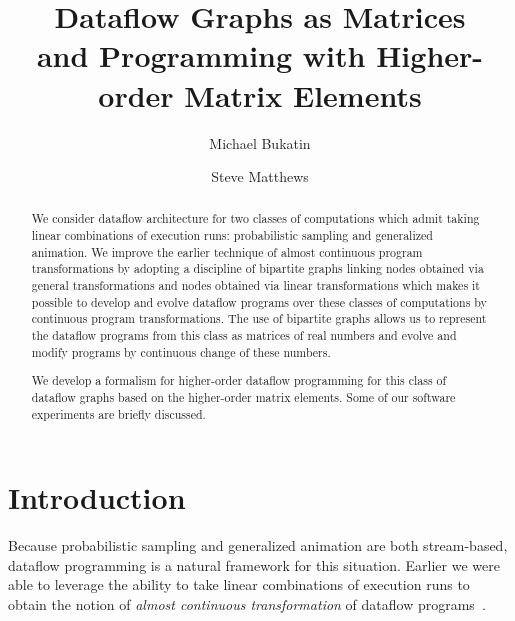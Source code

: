 \documentclass[withtimes]{easychair}
\begin{document}
\title{Dataflow Graphs as Matrices\\ and Programming with Higher-order Matrix Elements}
\author{Michael Bukatin\and Steve Matthews}


\maketitle

\begin{abstract}
We consider dataflow architecture for two classes of computations which admit taking linear combinations of execution runs:
probabilistic sampling and generalized animation. We improve the earlier technique of almost continuous program transformations
by adopting a discipline of bipartite graphs linking nodes obtained via general transformations and nodes obtained
via linear transformations which makes it possible to develop and evolve dataflow programs over these classes
of computations by continuous program transformations. The use of bipartite graphs allows us to
represent the dataflow programs from this class as matrices of real numbers and evolve and
modify programs by continuous change of these numbers. 

We develop a formalism for
higher-order dataflow programming for this class of dataflow graphs based on the higher-order matrix elements. Some of our software experiments
are briefly discussed.



\end{abstract}

\section{Introduction}

Because probabilistic sampling and generalized animation are both stream-based,
dataflow programming is a natural framework for this situation. Earlier we were able to
leverage the ability to take linear combinations of execution runs to obtain the
notion of {\em almost continuous transformation} of dataflow programs~\cite{MBukatinMatthews}.
\end{document}
